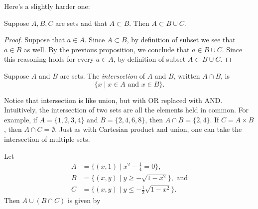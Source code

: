 \documentclass{tufte-book}
\begin{document}
Here's a slightly harder one:
\begin{proposition}
  Suppose $A, B, C$ are sets and that $A \subset B$. Then $A \subset B \cup C$.
\end{proposition}

\begin{proof}
  Suppose that $a \in A$. Since $A \subset B$, by definition of subset we see that $a \in B$ as well. By the previous proposition, we conclude that $a \in B \cup C$. Since this reasoning holds for every $a \in A$, by definition of subset $A \subset B \cup C$.
\end{proof}

\begin{definition}
  Suppose $A$ and $B$ are sets. The \emph{intersection} of $A$ and $B$, written $A \cap B$, is
  \[
  \{x \mid x \in A \text{ and } x \in B\}.
  \]
\end{definition}
Notice that intersection is like union, but with OR replaced with AND. Intuitively, the intersection of two sets are all the elements held in common. For example, if $A = \{1, 2, 3, 4\}$ and $B = \{2, 4, 6, 8\}$, then $A \cap B = \{2, 4\}$. If $C = A \times B$, then $A \cap C = \emptyset$. Just as with Cartesian product and union, one can take the intersection of multiple sets.

\begin{example}\label{ex:filled-smile}
  Let
  \begin{align*}
    A &= \bigg\{(x, 1) \mid x^2 - \frac14 = 0\bigg\},\\
    B &= \{(x,y) \mid y \geq -\sqrt{1-x^2}\}, \text{ and}\\
    C &= \bigg\{(x,y) \mid y \leq -\frac12\sqrt{1-x^2}\bigg\}.
  \end{align*}
  Then $A \cup (B \cap C)$ is given by
    \begin{center}
  \end{center}

\end{example}
\end{document}

